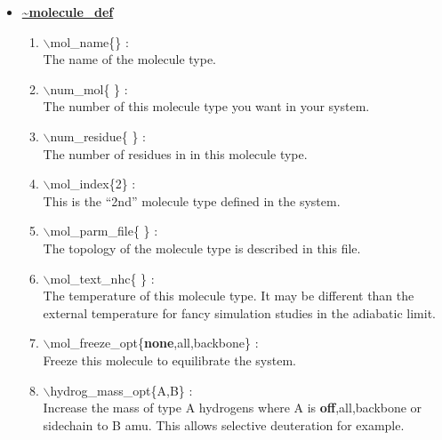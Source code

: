 \begin{itemize}

\clearpage
\huge
\item[] \underline{\bf \~{}molecule\_def}
\begin{enumerate}

 \vspace{0.15in} \Large
 \item  $\backslash$mol\_name\{\} : \\
    \large
   The name of the molecule type.

 \vspace{0.15in} \Large
 \item  $\backslash$num\_mol\{ \} : \\ 
    \large
   The number of this molecule type you want in your system.

 \vspace{0.15in} \Large
 \item  $\backslash$num\_residue\{ \} : \\
    \large
   The number of residues in in this molecule type.

 \vspace{0.15in} \Large
 \item  $\backslash$mol\_index\{2\} : \\ 
    \large
   This is the ``2nd'' molecule type defined in the system.

 \vspace{0.15in} \Large
 \item  $\backslash$mol\_parm\_file\{ \} : \\
    \large
   The topology of the molecule type is described in this file.

 \vspace{0.15in} \Large
 \item  $\backslash$mol\_text\_nhc\{ \} : \\
    \large
   The temperature of this molecule type. It may be different than the
   external temperature for fancy simulation studies in the adiabatic limit.

 \vspace{0.15in} \Large
 \item  $\backslash$mol\_freeze\_opt\{{\bf none},all,backbone\} : \\
    \large
    Freeze this molecule to equilibrate the system.

 \vspace{0.15in} \Large
 \item  $\backslash$hydrog\_mass\_opt\{A,B\} : \\
    \large
   Increase the mass of type A hydrogens where A is 
   {\bf off},all,backbone or sidechain to B amu. This allows
   selective deuteration for example.


\end{enumerate}
\end{itemize}
